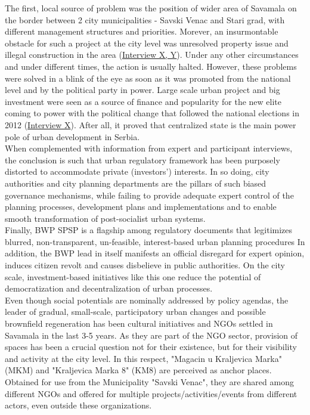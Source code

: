 \documentclass[11pt]{report}
\begin{document}
The first, local source of problem was the position of wider area of Savamala on the border between 2 city municipalities - Savski Venac and Stari grad, with different management structures and priorities. Morever, an insurmontable obstacle for such a project at the city level was unresolved property issue and illegal construction in the area
(\href{InterviewX}{Interview X, Y}).
Under any other circumstances and under different times, the action is usually halted.
However, these problems were solved in a blink of the eye as soon as it was promoted from the national level and by the political party in power. 
Large scale urban project and big investment were seen as a source of finance and popularity for the new elite coming to power with the political change that followed the national elections in 2012
(\href{InterviewX}{Interview X}).
After all, it proved that centralized state is the main power pole of urban development in Serbia.
\\

When complemented with information from expert and participant interviews, the conclusion is such that urban regulatory framework has been purposely distorted to accommodate private (investors’) interests.
In so doing, city authorities and city planning departments are the pillars of such biased governance mechanisms, while failing to provide adequate expert control of the planning processes, development plans and implementations and to enable smooth transformation of post-socialist urban systems.
\\

Finally, BWP SPSP is a flagship among regulatory documents that legitimizes blurred, non-transparent, un-feasible, interest-based urban planning procedures
In addition, the BWP lead in itself manifests an official disregard for expert opinion, induces citizen revolt and causes disbelieve in public authorities.
On the city scale, investment-based initiatives like this one reduce the potential of democratization and decentralization of urban processes.
\\

Even though social potentials are nominally addressed by policy agendas, the leader of gradual, small-scale, participatory urban changes and possible brownfield regeneration has been cultural initiatives and NGOs settled in Savamala in the last 3-5 years.
As they are part of the NGO sector, provision of spaces has been 
a crucial question not for their existence, but for their visibility and activity at the city level.
In this respect, "Magacin u Kraljevica Marka" (MKM) and "Kraljevica Marka 8" (KM8) are perceived as anchor places.
Obtained for use from the Municipality "Savski Venac", they are  shared among different NGOs and offered for multiple projects/activities/events from different actors, even outside these organizations.
\\
\end{document}
